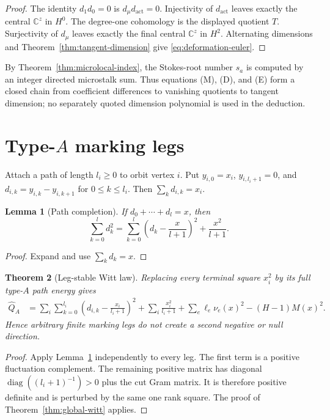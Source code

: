 \documentclass[11pt,a4paper]{amsart}
\theoremstyle{plain}
\newtheorem{theorem}{Theorem}[section]
\newtheorem{lemma}[theorem]{Lemma}
\theoremstyle{definition}
\newcommand{\CC}{\mathbb C}
\begin{document}
\begin{proof}
The identity $d_1d_0=0$ is $d_\mu d_{\mathrm{act}}=0$.  Injectivity of
$d_{\mathrm{act}}$ leaves exactly the central $\CC^z$ in $H^0$.  The degree-one cohomology is the
displayed quotient $T$.  Surjectivity of $d_\mu$ leaves exactly the final central $\CC^z$ in
$H^2$.  Alternating dimensions and Theorem~\ref{thm:tangent-dimension} give
\eqref{eq:deformation-euler}.
\end{proof}

By Theorem~\ref{thm:microlocal-index}, the Stokes-root number $s_a$ is computed by an integer
directed microstalk sum.  Thus equations (M), (D), and (E) form a closed chain from coefficient
differences to vanishing quotients to tangent dimension; no separately quoted dimension polynomial
is used in the deduction.

\section{Type-$A$ marking legs}\label{sec:legs}

Attach a path of length $l_i\geq0$ to orbit vertex $i$.  Put
$y_{i,0}=x_i$, $y_{i,l_i+1}=0$, and
$d_{i,k}=y_{i,k}-y_{i,k+1}$ for $0\leq k\leq l_i$.  Then
$\sum_kd_{i,k}=x_i$.

\begin{lemma}[Path completion]\label{lem:path-completion}
If $d_0+\cdots+d_l=x$, then
\begin{equation}\label{eq:path-completion}
 \sum_{k=0}^{l}d_k^2=
 \sum_{k=0}^{l}\left(d_k-\frac{x}{l+1}\right)^2+\frac{x^2}{l+1}.
\end{equation}
\end{lemma}

\begin{proof}
Expand and use $\sum_kd_k=x$.
\end{proof}

\begin{theorem}[Leg-stable Witt law]\label{thm:legs}
Replacing every terminal square $x_i^2$ by its full type-$A$ path energy gives
\begin{align}\label{eq:leg-law}
 \widehat Q_A
 &=\sum_i\sum_{k=0}^{l_i}\left(d_{i,k}-\frac{x_i}{l_i+1}\right)^2
   +\sum_i\frac{x_i^2}{l_i+1}
   +\sum_e\ell_e\nu_e(x)^2-(H-1)M(x)^2.
\end{align}
Hence arbitrary finite marking legs do not create a second negative or null direction.
\end{theorem}

\begin{proof}
Apply Lemma~\ref{lem:path-completion} independently to every leg.  The first term is a positive
fluctuation complement.  The remaining positive matrix has diagonal
$\operatorname{diag}((l_i+1)^{-1})>0$ plus the cut Gram matrix.  It is therefore positive definite
and is perturbed by the same one rank square.  The proof of Theorem~\ref{thm:global-witt} applies.
\end{proof}
\end{document}
